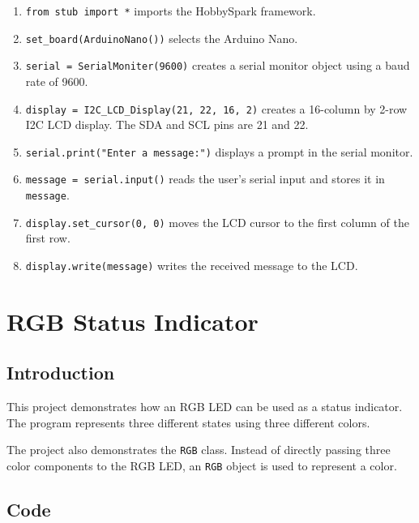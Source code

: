 \begin{enumerate}
    \item \texttt{from stub import *} imports the HobbySpark framework.

    \item \texttt{set\_board(ArduinoNano())} selects the Arduino Nano.

    \item \texttt{serial = SerialMoniter(9600)} creates a serial monitor
    object using a baud rate of 9600.

    \item \texttt{display = I2C\_LCD\_Display(21, 22, 16, 2)} creates a
    16-column by 2-row I2C LCD display. The SDA and SCL pins are 21 and 22.

    \item \texttt{serial.print("Enter a message:")} displays a prompt in
    the serial monitor.

    \item \texttt{message = serial.input()} reads the user's serial input
    and stores it in \texttt{message}.

    \item \texttt{display.set\_cursor(0, 0)} moves the LCD cursor to the
    first column of the first row.

    \item \texttt{display.write(message)} writes the received message to
    the LCD.
\end{enumerate}


\newpage

\section{RGB Status Indicator}

\subsection{Introduction}

This project demonstrates how an RGB LED can be used as a status indicator.
The program represents three different states using three different colors.

The project also demonstrates the \texttt{RGB} class. Instead of directly
passing three color components to the RGB LED, an \texttt{RGB} object is
used to represent a color.

\subsection{Code}

